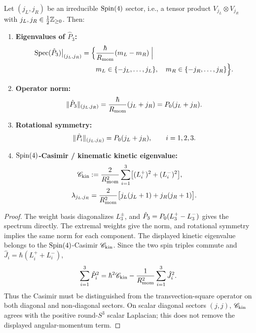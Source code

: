 \documentclass[12pt,a4paper]{article}
\begin{document}
\begin{proposition}
\label{p2:prop:component_spectrum}
Let $(j_L,j_R)$ be an irreducible $\mathrm{Spin}(4)$ sector, i.e., a tensor product $V_{j_L}\otimes V_{j_R}$ with $j_L,j_R\in\frac12\mathbb{Z}_{\ge0}$. Then:
\begin{enumerate}[label=(\roman*), leftmargin=*, itemsep=6pt]
    \item \textbf{Eigenvalues of $\hat P_3$:}
    \begin{equation}
    \begin{aligned}
    \operatorname{Spec}(\hat P_3)\big|_{(j_L,j_R)}
    =\Bigl\{&\frac{\hbar}{R_{\mathrm{mom}}}(m_L-m_R)\;\Big|\\
             &m_L\in\{-j_L,\ldots,j_L\},\quad
              m_R\in\{-j_R,\ldots,j_R\}\Bigr\}.
    \end{aligned}
    \end{equation}
    \item \textbf{Operator norm:}
    \begin{equation}
    \|\hat P_3\|_{(j_L,j_R)}=
    \frac{\hbar}{R_{\mathrm{mom}}}(j_L+j_R)=P_{0}(j_L+j_R).
    \end{equation}
    \item \textbf{Rotational symmetry:}
    \begin{equation}
    \|\hat P_i\|_{(j_L,j_R)}=P_{0}(j_L+j_R),\qquad i=1,2,3.
    \end{equation}
    \item \textbf{\(\mathrm{Spin}(4)\)-Casimir / kinematic kinetic eigenvalue:}
    \begin{equation}
    \begin{aligned}
    \mathscr C_{\rm kin}
    &:=\frac{2}{R_{\mathrm{mom}}^2}\sum_{i=1}^3
       \bigl[(L_i^+)^2+(L_i^-)^2\bigr],\\
    \lambda_{j_L,j_R}
    &=\frac{2}{R_{\mathrm{mom}}^2}\bigl[j_L(j_L+1)+j_R(j_R+1)\bigr].
    \end{aligned}
    \end{equation}
\end{enumerate}
\end{proposition}

\begin{proof}
The weight basis diagonalizes $L_3^\pm$, and
$\hat P_3=P_{0}(L_3^+-L_3^-)$ gives the spectrum directly.  The extremal
weights give the norm, and rotational symmetry implies the same norm for
each component.  The displayed kinetic eigenvalue belongs to the
\(\mathrm{Spin}(4)\)-Casimir \(\mathscr C_{\rm kin}\).  Since the two spin triples
commute and \(\hat J_i=\hbar(L_i^++L_i^-)\),
\[
 \sum_{i=1}^3\hat P_i^2
 =\hbar^2\mathscr C_{\rm kin}
  -\frac{1}{R_{\mathrm{mom}}^2}\sum_{i=1}^3\hat J_i^2.
\]
Thus the Casimir must be distinguished from the transvection-square operator
on both diagonal and non-diagonal sectors.  On scalar diagonal sectors
\((j,j)\), \(\mathscr C_{\rm kin}\) agrees with the positive round-$S^3$
scalar Laplacian; this does not remove the displayed angular-momentum term.
\end{proof}
\end{document}
